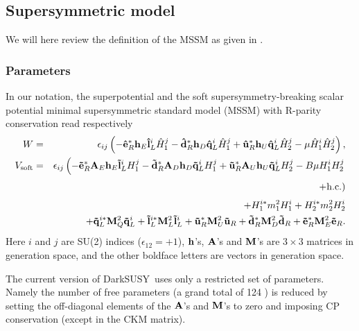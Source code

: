\documentclass[a4paper,10pt,oneside]{book}
\newcommand{\ds}{{\sffamily DarkSUSY}}
\begin{document}
\label{sec:ge}

\subsection{Supersymmetric model}

We will here review the definition of the MSSM as given in \cite{ds4}.

\subsubsection{Parameters}

In our notation, the superpotential and the soft supersymmetry-breaking scalar
potential minimal supersymmetric standard model (MSSM) with R-parity
conservation \cite{Haber:1984rc,Gunion:1984yn,Haber:1988px} read respectively
\begin{eqnarray}
  W &=& \epsilon_{ij} \left(
  - {\bf \hat{e}}_{R}^{*} {\bf h}_E {\bf \hat{l}}^i_{L} {\hat H}^j_1 
  - {\bf \hat{d}}_{R}^{*} {\bf h}_D {\bf \hat{q}}^i_{L} {\hat H}^j_1 
  + {\bf \hat{u}}_{R}^{*} {\bf h}_U {\bf \hat{q}}^i_{L} {\hat H}^j_2 
  - \mu {\hat H}^i_1 {\hat H}^j_2 
  \right),
\\
  V_{{\rm soft}} & = & 
  \epsilon_{ij} \left(
    -{\bf \tilde{e}}_{R}^{*} {\bf A}_E {\bf h}_E {\bf \tilde{l}}^i_{L} H^j_1 
  - {\bf \tilde{d}}_{R}^{*} {\bf A}_D {\bf h}_D {\bf \tilde{q}}^i_{L} H^j_1 
  + {\bf \tilde{u}}_{R}^{*} {\bf A}_U {\bf h}_U {\bf \tilde{q}}^i_{L} H^j_2
  - B \mu H^i_1 H^j_2 
  \right. \nonumber \\ && \phantom{\epsilon_{ij} \Bigl(} \left.
  + {\rm h.c.} 
  \right) \nonumber \\ &&
  + H^{i*}_1 m_1^2 H^i_1 + H^{i*}_2 m_2^2 H^i_2
  \nonumber \\ && +
  {\bf \tilde{q}}_{L}^{i*} {\bf M}_{Q}^{2} {\bf \tilde{q}}^i_{L} + 
  {\bf \tilde{l}}_{L}^{i*} {\bf M}_{L}^{2} {\bf \tilde{l}}^i_{L} + 
  {\bf \tilde{u}}_{R}^{*} {\bf M}_{U}^{2} {\bf \tilde{u}}_{R} + 
  {\bf \tilde{d}}_{R}^{*} {\bf M}_{D}^{2} {\bf \tilde{d}}_{R} + 
  {\bf \tilde{e}}_{R}^{*} {\bf M}_{E}^{2} {\bf \tilde{e}}_{R} .
\end{eqnarray}
Here $i$ and $j$ are SU(2) indices ($\epsilon_{12} = +1$), ${\bf h}$'s, ${\bf
  A}$'s and ${\bf M}$'s are $3\times3$ matrices in generation space,
and the other boldface letters are vectors in generation space.
  
The current version of \ds\ uses only a restricted set of parameters.
Namely the number of free parameters (a grand total of 124 \cite{Dimopoulos:1995kn})
is reduced by setting the off-diagonal elements of the ${\bf A}$'s and ${\bf
  M}$'s to zero and imposing CP conservation (except in the CKM matrix). 
\end{document}
